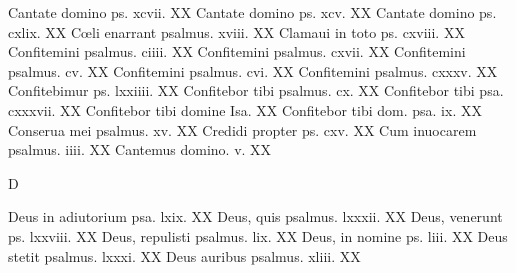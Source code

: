 \documentclass[a5paper,10pt]{book}
\def\oe{œ}
\begin{document}
\begin{multicols}{2}
\vspace{-.75em}
\par \noindent Cantate domino ps. xcvii. \hfill XX
\newline Cantate domino ps. xcv. \hfill XX
\newline Cantate domino ps. cxlix. \hfill XX
\newline C\oe li enarrant psalmus. xviii. \hfill XX
\newline Clamaui in toto ps. cxviii. \hfill XX
\newline Confitemini psalmus. ciiii. \hfill XX
\newline Confitemini psalmus. cxvii. \hfill XX
\newline Confitemini psalmus. cv. \hfill XX
\newline Confitemini psalmus. cvi. \hfill XX
\newline Confitemini psalmus. cxxxv. \hfill XX
\newline Confitebimur ps. lxxiiii. \hfill XX
\newline Confitebor tibi psalmus. cx. \hfill XX
\newline Confitebor tibi psa. cxxxvii. \hfill XX
\newline Confitebor tibi domine Isa. \hfill XX
\newline Confitebor tibi dom. psa. ix. \hfill XX
\newline Conserua mei psalmus. xv. \hfill XX
\newline Credidi propter ps. cxv. \hfill XX
\newline Cum inuocarem psalmus. iiii. \hfill XX
\newline Cantemus domino. v. \hfill XX
\newline \vspace{-1.75em}
\begin{center}
\color{red} D
\end{center}
\vspace{-.75em}
\par \noindent Deus in adiutorium psa. lxix. \hfill XX
\newline Deus, quis psalmus. lxxxii. \hfill XX
\newline Deus, venerunt ps. lxxviii. \hfill XX
\newline Deus, repulisti psalmus. lix. \hfill XX
\newline Deus, in nomine ps. liii. \hfill XX
\newline Deus stetit psalmus. lxxxi. \hfill XX
\newline Deus auribus psalmus. xliii. \hfill XX

\end{multicols}
\end{document}
